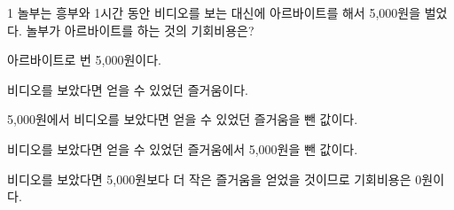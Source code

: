\begin{question}{1}
놀부는 흥부와 1시간 동안 비디오를 보는 대신에 아르바이트를 해서 5,000원을 벌었다. 놀부가 아르바이트를 하는 것의 기회비용은?
\begin{choices}
  \item 아르바이트로 번 5,000원이다.
  \item 비디오를 보았다면 얻을 수 있었던 즐거움이다.
  \item 5,000원에서 비디오를 보았다면 얻을 수 있었던 즐거움을 뺀 값이다.
  \item 비디오를 보았다면 얻을 수 있었던 즐거움에서 5,000원을 뺀 값이다.
  \item 비디오를 보았다면 5,000원보다 더 작은 즐거움을 얻었을 것이므로 기회비용은 0원이다.
\end{choices}
\end{question}
